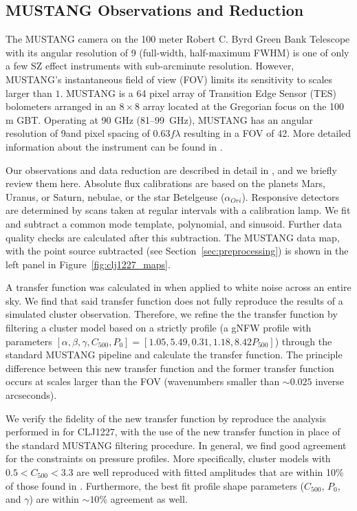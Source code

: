 \documentclass[twocolumn,traditabstract]{aa}
\begin{document}
\subsection{MUSTANG Observations and Reduction}
\label{sec:musobs}
The MUSTANG camera \citep{dicker2008}
on the 100 meter Robert C. Byrd Green Bank Telescope \citep[GBT, ][]{jewell2004} with its angular resolution of 9\asec 
(full-width, half-maximum FWHM) is one of only a few SZ effect instruments with sub-arcminute resolution.
However, MUSTANG's instantaneous field of view (FOV) limits its sensitivity to scales larger than $1$\amin.
MUSTANG is a 64 pixel array of Transition Edge Sensor (TES) bolometers arranged in an $8 \times 8$ array
located at the Gregorian focus on the 100 m GBT. Operating at 90 GHz (81--99~GHz),
MUSTANG has an angular resolution of 9\asec and pixel spacing of 0.63$f \lambda$ resulting in a FOV
of 42\asec. More detailed information about the instrument can be found in \citet{dicker2008}.

Our observations and data reduction are described in detail in \citet{romero2015a}, and we briefly review them
here. Absolute flux calibrations are based on the planets Mars, Uranus, or Saturn, nebulae, or the star Betelgeuse 
($\alpha_{Ori}$). Responsive detectors are determined by scans taken at regular intervals with a calibration lamp.
We fit and subtract a common mode template, polynomial, and sinusoid. Further data quality checks are calculated
after this subtraction. The MUSTANG data map, with the point source subtracted (see Section~\ref{sec:preprocessing})
is shown in the left panel in Figure~\ref{fig:clj1227_maps}.


A transfer function was calculated in \citet{romero2016} when applied to white noise
across an entire sky. We find that said transfer function does not fully reproduce the results of a simulated
cluster observation. Therefore, we refine the the transfer function by filtering a cluster model based on a strictly
 profile (a gNFW profile with parameters
$[\alpha,\beta,\gamma,C_{500},P_0]=[1.05,5.49,0.31,1.18,8.42 P_{500}]$) through the standard MUSTANG pipeline and calculate
the transfer function. The principle difference between this new transfer function and the former transfer function
occurs at scales larger than the FOV (wavenumbers smaller than $\sim0.025$ inverse arcseconds).

We verify the fidelity of the new transfer function by reproduce the analysis performed in \citet{romero2016} for CLJ1227,
with the use of the new transfer function in place of the standard MUSTANG filtering procedure.
In general, we find good agreement for the constraints on pressure profiles. More specifically, cluster models with
$0.5 < C_{500} < 3.3$ are well reproduced with fitted amplitudes that are within 10\% of those found in \citet{romero2016}.
Furthermore, the best fit profile shape parameters ($C_{500}$, $P_0$, and $\gamma$) are within $\sim10$\% agreement as well.
\end{document}
